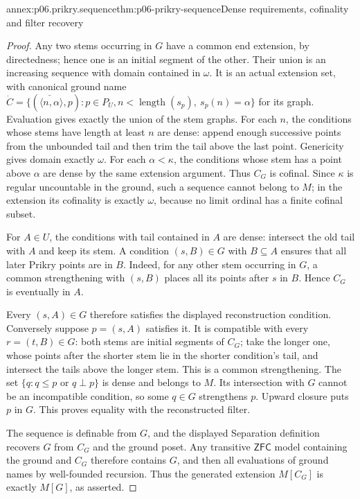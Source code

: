 \begin{annexitem}{annex:p06.prikry.sequence}{thm:p06-prikry-sequence}{Dense requirements, cofinality and filter recovery}
\begin{proof}
Any two stems occurring in \(G\) have a common end extension, by
directedness; hence one is an initial segment of the other. Their union
is an increasing sequence with domain contained in \(\omega\).
It is an actual extension set, with canonical ground name
\(\dot C=\{(\check{\langle n,\alpha\rangle},p):p\in P_U,
 n<\operatorname{length}(s_p),\ s_p(n)=\alpha\}\)
for its graph. Evaluation gives exactly the union of the stem graphs.
For each \(n\), the conditions whose stems have length at least \(n\)
are dense: append enough successive points from the unbounded tail and
then trim the tail above the last point. Genericity gives domain exactly
\(\omega\). For each \(\alpha<\kappa\), the conditions whose stem has
a point above \(\alpha\) are dense by the same extension argument.
Thus \(C_G\) is cofinal. Since \(\kappa\) is regular uncountable in
the ground, such a sequence cannot belong to \(M\); in the extension
its cofinality is exactly \(\omega\), because no limit ordinal has
a finite cofinal subset.

For \(A\in U\), the conditions with tail contained in \(A\) are
dense: intersect the old tail with \(A\) and keep its stem. A condition
\((s,B)\in G\) with \(B\subseteq A\) ensures that all later Prikry
points are in \(B\). Indeed, for any other stem occurring in \(G\),
a common strengthening with \((s,B)\) places all its points after
\(s\) in \(B\). Hence \(C_G\) is eventually in \(A\).

Every \((s,A)\in G\) therefore satisfies the displayed reconstruction
condition. Conversely suppose \(p=(s,A)\) satisfies it. It is compatible
with every \(r=(t,B)\in G\): both stems are initial segments of
\(C_G\); take the longer one, whose points after the shorter stem lie
in the shorter condition's tail, and intersect the tails above the longer
stem. This is a common strengthening. The set
\(\{q:q\leq p\text{ or }q\perp p\}\) is dense and belongs to \(M\).
Its intersection with \(G\) cannot be an incompatible condition, so
some \(q\in G\) strengthens \(p\). Upward closure puts \(p\) in \(G\).
This proves equality with the reconstructed filter.

The sequence is definable from \(G\), and the displayed Separation
definition recovers \(G\) from \(C_G\) and the ground poset. Any
transitive \(\mathsf{ZFC}\) model containing the ground and \(C_G\)
therefore contains \(G\), and then all evaluations of ground names by
well-founded recursion. Thus the generated extension \(M[C_G]\) is
exactly \(M[G]\), as asserted.
\end{proof}
\end{annexitem}

